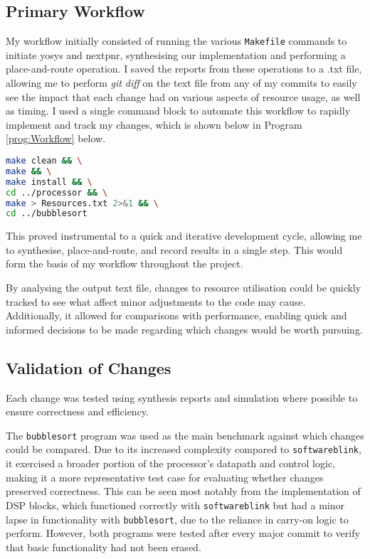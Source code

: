 \documentclass[a4paper,10pt]{article}
\begin{document}
\subsection*{Primary Workflow}
My workflow initially consisted of running the various \texttt{Makefile}
commands to initiate yosys and nextpnr, 
synthesising our implementation and performing a place-and-route operation.
I saved the reports from these operations to a .txt file, 
allowing me to perform \textit{git diff} on the text file 
from any of my commits to easily see the impact that each change had 
on various aspects of resource usage, as well as timing.
I used a single command block to automate this workflow 
to rapidly implement and track my changes, 
which is shown below in Program \ref{prog:Workflow} below.

\begin{lstlisting}[language=bash,
    caption={Workflow used to synthesise and record results},
    label={prog:Workflow}]
make clean && \
make && \
make install && \
cd ../processor && \
make > Resources.txt 2>&1 && \
cd ../bubblesort
\end{lstlisting}

This proved instrumental to a quick and iterative development cycle, 
allowing me to synthesise, place-and-route, and record results in a single step.
This would form the basis of my workflow throughout the project.

By analysing the output text file, changes to resource utilisation
could be quickly tracked to see what affect minor adjustments to the code may cause.
Additionally, it allowed for comparisons with performance,
enabling quick and informed decisions to be made regarding which changes 
would be worth pursuing.

\subsection*{Validation of Changes}

Each change was tested using synthesis reports and 
simulation where possible to ensure correctness and efficiency.

The \texttt{bubblesort} program was used as the main benchmark 
against which changes could be compared. 
Due to its increased complexity compared to \texttt{softwareblink}, 
it exercised a broader portion of the processor's datapath and control logic, 
making it a more representative test case for evaluating 
whether changes preserved correctness. 
This can be seen most notably from the implementation of DSP blocks,
which functioned correctly with \texttt{softwareblink} 
but had a minor lapse in functionality with \texttt{bubblesort},
due to the reliance in carry-on logic to perform.
However, both programs were tested after every major commit to verify 
that basic functionality had not been erased.
\end{document}
